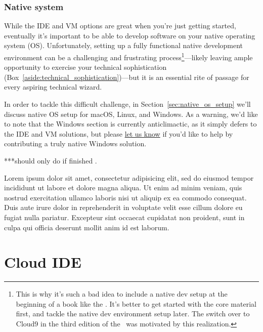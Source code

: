 \subsubsection{Native system} %
\label{sec:native_system}

While the IDE and VM options are great when you're just getting started, eventually it's important to be able to develop software on your native operating system (OS). Unfortunately, setting up a fully functional native development environment can be a challenging and frustrating process\footnote{This is why it's such a bad idea to include a native dev setup at the beginning of a book like the \rort. It's better to get started with the core material first, and tackle the native dev environment setup later. The switch over to Cloud9 in the third edition of the \rort\ was motivated by this realization.}---likely leaving ample opportunity to exercise your technical sophistication (Box~\ref{aside:technical_sophistication})---but it is an essential rite of passage for every aspiring technical wizard.

In order to tackle this difficult challenge, in Section~\ref{sec:native_os_setup} we'll discuss native OS setup for macOS, Linux, and Windows. As a warning, we'd like to note that the Windows section is currently anticlimactic, as it simply defers to the IDE and VM solutions, but please \href{mailto:support@learnenough.com}{let us know} if you'd like to help by contributing a truly native Windows solution.

***should only do if finished \lecl.

\begin{aside}
\label{aside:technical_sophistication}

Lorem ipsum dolor sit amet, consectetur adipisicing elit, sed do eiusmod
tempor incididunt ut labore et dolore magna aliqua. Ut enim ad minim veniam,
quis nostrud exercitation ullamco laboris nisi ut aliquip ex ea commodo
consequat. Duis aute irure dolor in reprehenderit in voluptate velit esse
cillum dolore eu fugiat nulla pariatur. Excepteur sint occaecat cupidatat non
proident, sunt in culpa qui officia deserunt mollit anim id est laborum.

\end{aside}



\section{Cloud IDE}
\label{sec:cloud_ide}


